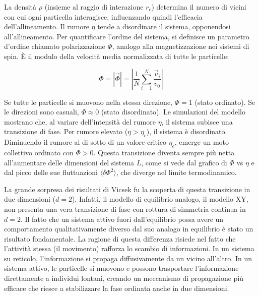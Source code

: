 La densità $\rho$ (insieme al raggio di interazione $r_c$) determina il numero di vicini con cui ogni particella interagisce, influenzando quindi l'efficacia dell'allineamento. Il rumore $\eta$ tende a disordinare il sistema, opponendosi all'allineamento.
Per quantificare l'ordine del sistema, si definisce un parametro d'ordine chiamato polarizzazione $\Phi$, analogo alla magnetizzazione nei sistemi di spin. È il modulo della velocità media normalizzata di tutte le particelle:

\begin{equation} \label{eq:ch27_35}
\Phi = \left| \vec{\Phi} \right| = \left| \frac{1}{N} \sum_{i=1}^{N} \frac{\vec{v}_i}{v_0} \right|
\end{equation}



Se tutte le particelle si muovono nella stessa direzione, $\Phi=1$ (stato ordinato). Se le direzioni sono casuali, $\Phi \approx 0$ (stato disordinato).
Le simulazioni del modello mostrano che, al variare dell'intensità del rumore $\eta$, il sistema subisce una transizione di fase. Per rumore elevato ($\eta > \eta_c$), il sistema è disordinato.
Diminuendo il rumore al di sotto di un valore critico $\eta_c$, emerge un moto collettivo ordinato con $\Phi > 0$.
Questa transizione diventa sempre più netta all'aumentare delle dimensioni del sistema $L$, come si vede dal grafico di $\Phi$ vs $\eta$ e dal picco delle sue fluttuazioni $\langle \delta\Phi^2 \rangle$, che diverge nel limite termodinamico.

La grande sorpresa dei risultati di Vicsek fu la scoperta di questa transizione in due dimensioni ($d=2$). Infatti, il modello di equilibrio analogo, il modello XY, non presenta una vera transizione di fase con rottura di simmetria continua in $d=2$. Il fatto che un sistema attivo fuori dall'equilibrio possa avere un comportamento qualitativamente diverso dal suo analogo in equilibrio è stato un risultato fondamentale.
La ragione di questa differenza risiede nel fatto che l'attività stessa (il movimento) rafforza lo scambio di informazioni. In un sistema su reticolo, l'informazione si propaga diffusivamente da un vicino all'altro. In un sistema attivo, le particelle si muovono e possono trasportare l'informazione direttamente a individui lontani, creando un meccanismo di propagazione più efficace che riesce a stabilizzare la fase ordinata anche in due dimensioni.
